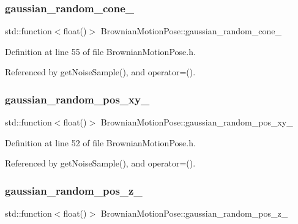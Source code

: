 \subsubsection{\texorpdfstring{gaussian\+\_\+random\+\_\+cone\+\_\+}{gaussian\_random\_cone\_}}
{\footnotesize\ttfamily std\+::function$<$float()$>$ Brownian\+Motion\+Pose\+::gaussian\+\_\+random\+\_\+cone\+\_\+\hspace{0.3cm}{\ttfamily [protected]}}



Definition at line 55 of file Brownian\+Motion\+Pose.\+h.



Referenced by get\+Noise\+Sample(), and operator=().

\mbox{\label{classBrownianMotionPose_a3b9538edc2fe02b6ec1621b8f65d47d9}} 
\subsubsection{\texorpdfstring{gaussian\+\_\+random\+\_\+pos\+\_\+xy\+\_\+}{gaussian\_random\_pos\_xy\_}}
{\footnotesize\ttfamily std\+::function$<$float()$>$ Brownian\+Motion\+Pose\+::gaussian\+\_\+random\+\_\+pos\+\_\+xy\+\_\+\hspace{0.3cm}{\ttfamily [protected]}}



Definition at line 52 of file Brownian\+Motion\+Pose.\+h.



Referenced by get\+Noise\+Sample(), and operator=().

\mbox{\label{classBrownianMotionPose_ab1115a94b9b81cb8aa746327086d72ca}} 
\subsubsection{\texorpdfstring{gaussian\+\_\+random\+\_\+pos\+\_\+z\+\_\+}{gaussian\_random\_pos\_z\_}}
{\footnotesize\ttfamily std\+::function$<$float()$>$ Brownian\+Motion\+Pose\+::gaussian\+\_\+random\+\_\+pos\+\_\+z\+\_\+\hspace{0.3cm}{\ttfamily [protected]}}



